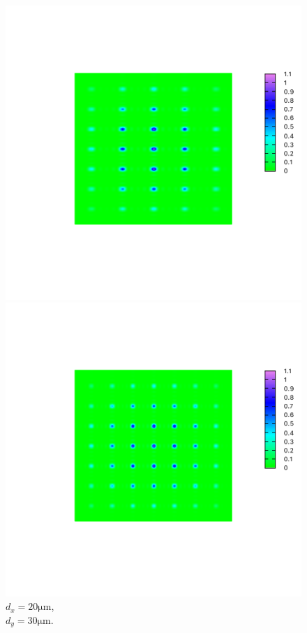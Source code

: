 \documentclass[11pt, twoside]{article}   	%
\theoremstyle{plain}
\theoremstyle{definition}
\begin{document}
\begin{description}
			\begin{figure}[htbp]
				\begin{minipage}[t]{0.32\linewidth}
				\centering
				\includegraphics[width=0.9\linewidth]{20-30}
				\caption{$d_x = 20 \mathrm{\mu m}$,\\$d_y = 30 \mathrm{\mu m}$.}
				\end{minipage}
				\begin{minipage}[t]{0.32\linewidth}
				\centering
				\includegraphics[width=0.9\linewidth]{30-30}

\end{minipage}
\end{figure}
\end{description}
\end{document}
